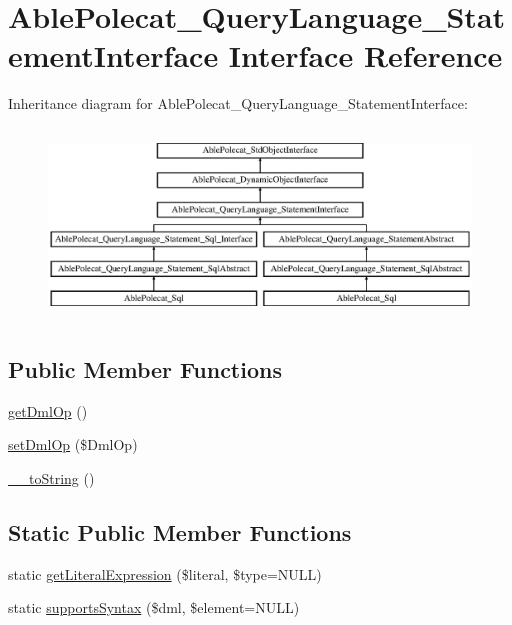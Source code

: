 \hypertarget{interface_able_polecat___query_language___statement_interface}{}\section{Able\+Polecat\+\_\+\+Query\+Language\+\_\+\+Statement\+Interface Interface Reference}
\label{interface_able_polecat___query_language___statement_interface}
Inheritance diagram for Able\+Polecat\+\_\+\+Query\+Language\+\_\+\+Statement\+Interface\+:\begin{figure}[H]
\begin{center}
\leavevmode
\includegraphics[height=5.106383cm]{interface_able_polecat___query_language___statement_interface}
\end{center}
\end{figure}
\subsection*{Public Member Functions}
\begin{DoxyCompactItemize}
\item 
\hyperlink{interface_able_polecat___query_language___statement_interface_a0d3274dc69b5a32d134a11cca5dae6d1}{get\+Dml\+Op} ()
\item 
\hyperlink{interface_able_polecat___query_language___statement_interface_a1f112b4e45e5865f8547610268c72053}{set\+Dml\+Op} (\$Dml\+Op)
\item 
\hyperlink{interface_able_polecat___query_language___statement_interface_a7516ca30af0db3cdbf9a7739b48ce91d}{\+\_\+\+\_\+to\+String} ()
\end{DoxyCompactItemize}
\subsection*{Static Public Member Functions}
\begin{DoxyCompactItemize}
\item 
static \hyperlink{interface_able_polecat___query_language___statement_interface_a7e8b7ade103075378490c24d61b098bd}{get\+Literal\+Expression} (\$literal, \$type=N\+U\+L\+L)
\item 
static \hyperlink{interface_able_polecat___query_language___statement_interface_adde2717fdf822a3d83fed451a50c5ece}{supports\+Syntax} (\$dml, \$element=N\+U\+L\+L)
\end{DoxyCompactItemize}
